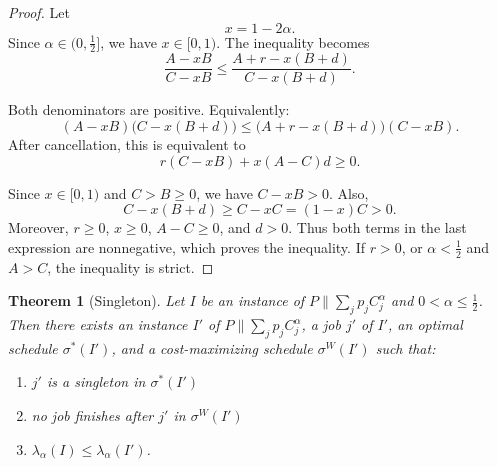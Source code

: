 \documentclass[%
english, titlepage=false %
]{./tum-templates/book/tumbook}
\newtheorem{theorem}{Theorem}
\newcommand{\Problem}{P\!\parallel\!\sum_j p_j C^{\alpha}_j}
\begin{document}
\begin{proof}

Let
\[
x=1-2\alpha.
\]
Since \(\alpha\in\Big(0,\frac12\Big]\), we have \(x\in[0,1)\). The inequality becomes
\[
\frac{A-xB}{C-xB}
\le
\frac{A+r-x(B+d)}{C-x(B+d)}.
\]

Both denominators are positive. Equivalently:
\[
(A-xB)\bigl(C-x(B+d)\bigr)
\le
\bigl(A+r-x(B+d)\bigr)(C-xB).
\]
After cancellation, this is equivalent to
\[
r(C-xB)+x(A-C)d\ge 0.
\]

Since \(x\in[0,1)\) and \(C>B\geq0\), we have \(C-xB>0\). Also,
\[
    C-x(B+d)\geq C-xC=(1-x)C>0.
\]
Moreover, \(r\geq0\), \(x\geq0\), \(A-C\geq0\), and \(d>0\).
Thus both terms in the last expression are nonnegative, which proves the
inequality.
If \(r>0\), or \(\alpha<\frac12\) and \(A>C\), the inequality is strict.
\end{proof}

\begin{theorem}[Singleton]\label{corr: singletonjob}
Let $I$ be an instance of $\Problem$ and $0 < \alpha \leq \frac{1}{2}$.
Then there exists an instance \(I'\) of $\Problem$, a job $j'$ of $I'$, an
optimal schedule \(\sigma^*(I')\), and a cost-maximizing schedule \(\sigma^W(I')\)
such that:
\begin{enumerate}
    \item \(j'\) is a singleton in \(\sigma^*(I')\)
    \item no job finishes after \(j'\) in \(\sigma^W(I')\)
    \item $\lambda_\alpha(I)\leq\lambda_\alpha(I')$.
\end{enumerate}
\end{theorem}
\end{document}

